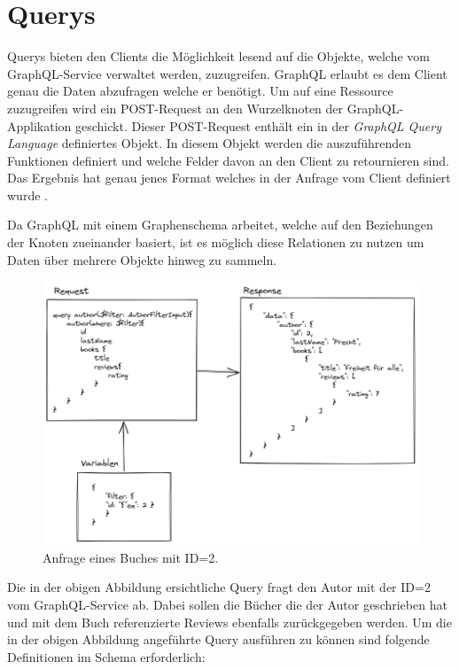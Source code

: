 
\section{Querys}

Querys bieten den Clients die Möglichkeit lesend auf die Objekte, welche vom GraphQL-Service verwaltet werden, zuzugreifen.
GraphQL erlaubt es dem Client genau die Daten abzufragen welche er benötigt.
Um auf eine Ressource zuzugreifen wird ein POST-Request an den Wurzelknoten der GraphQL-Applikation geschickt.
Dieser POST-Request enthält ein in der \textit{GraphQL Query Language} definiertes Objekt.
In diesem Objekt werden die auszuführenden Funktionen definiert und welche Felder davon an den Client zu retournieren sind.
Das Ergebnis hat genau jenes Format welches in der Anfrage vom Client definiert wurde \parencite[S.40-41]{kress2020graphql}.
\newline

Da GraphQL mit einem Graphenschema arbeitet, welche auf den Beziehungen der Knoten zueinander basiert, ist es möglich diese Relationen zu nutzen um Daten über mehrere Objekte hinweg zu sammeln.
\newline

\begin{figure}[H]
    \includegraphics[width=\textwidth]{pics/query_book_with_result.png}
    \caption{Anfrage eines Buches mit ID=2.}
\end{figure}

Die in der obigen Abbildung ersichtliche Query fragt den Autor mit der ID=2 vom GraphQL-Service ab.
Dabei sollen die Bücher die der Autor geschrieben hat und mit dem Buch referenzierte Reviews ebenfalls zurückgegeben werden.
Um die in der obigen Abbildung angeführte Query ausführen zu können sind folgende Definitionen im Schema erforderlich:

